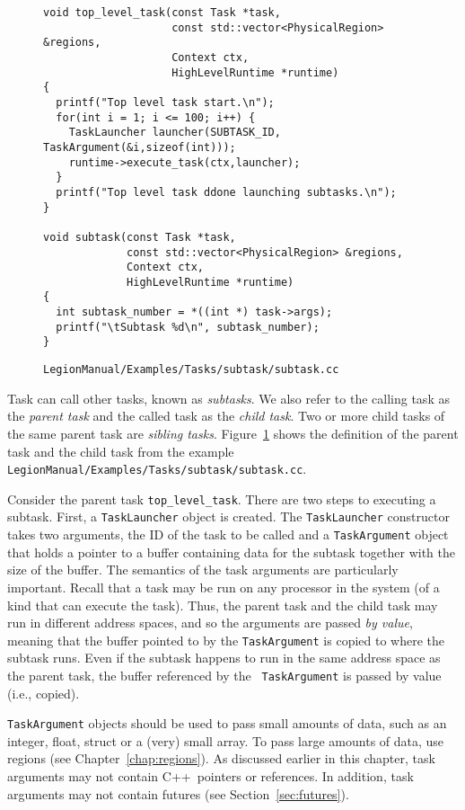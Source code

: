 \documentclass[11pt]{book}
\newcommand{\legionbook}[1]{{\tt LegionManual/Examples/#1}}
\newcommand{\Cpp}{C++}
\begin{document}
\begin{figure}
\begin{lstlisting}
void top_level_task(const Task *task,
                    const std::vector<PhysicalRegion> &regions,
                    Context ctx,
                    HighLevelRuntime *runtime)
{
  printf("Top level task start.\n");
  for(int i = 1; i <= 100; i++) {
    TaskLauncher launcher(SUBTASK_ID, TaskArgument(&i,sizeof(int)));
    runtime->execute_task(ctx,launcher);
  }
  printf("Top level task ddone launching subtasks.\n");
}

void subtask(const Task *task,
             const std::vector<PhysicalRegion> &regions,
             Context ctx,
             HighLevelRuntime *runtime)
{
  int subtask_number = *((int *) task->args);
  printf("\tSubtask %d\n", subtask_number);
}
\end{lstlisting}
\caption{\legionbook{Tasks/subtask/subtask.cc}}
\label{fig:subtask}
\end{figure}



Task can call other tasks, known as {\em subtasks}.  We also refer to
the calling task as the {\em parent task} and the called task as the
{\em child task}.  Two or more child tasks of the same parent task are
{\em sibling tasks}.  Figure~\ref{fig:subtask} shows the definition of
the parent task and the child task from the example
\legionbook{Tasks/subtask/subtask.cc}.

Consider the parent task {\tt top\_level\_task}.  There are two steps
to executing a subtask.  First, a {\tt TaskLauncher} object is
created.  The {\tt TaskLauncher}
constructor takes two arguments, the ID of the task to be called and a
{\tt TaskArgument} object that holds a pointer to a buffer containing
data for the subtask together with the size of the buffer.  The
semantics of the task arguments are particularly important.  Recall
that a task may be run on any processor in the system (of a kind that
can execute the task).  Thus, the parent task and the child task may
run in different address spaces, and so the arguments are passed
{\em by value}, meaning that the buffer pointed to by the {\tt TaskArgument} is
copied to where the subtask runs.  Even if the subtask happens to run in the
same address space as the parent task, the buffer referenced by the {\tt
  TaskArgument} is passed by value (i.e., copied).  

{\tt TaskArgument} objects should be used to pass small amounts of data,
such as an integer, float, struct or a (very) small array.  To pass large amounts of
data, use regions (see Chapter~\ref{chap:regions}).  As
discussed earlier in this chapter, task arguments may not contain
\Cpp\ pointers or references.  In addition, task arguments may not contain
futures (see Section~\ref{sec:futures}).
\end{document}
